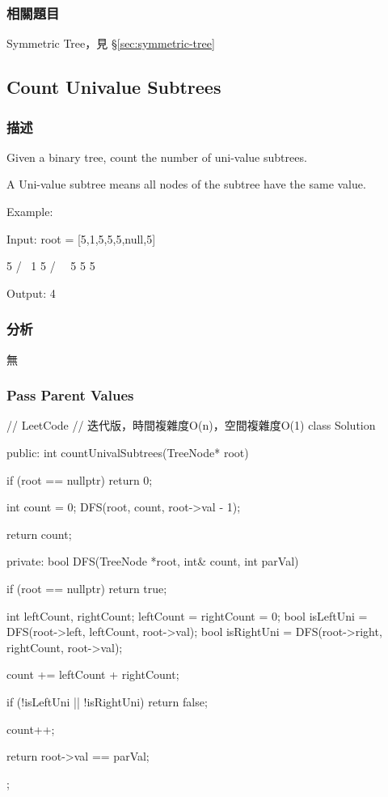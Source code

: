 \subsubsection{相關題目}
\begindot
\item Symmetric Tree，見 \S \ref{sec:symmetric-tree}
\myenddot

\subsection{Count Univalue Subtrees}
\label{sec:count-univalue-subtrees}


\subsubsection{描述}
Given a binary tree, count the number of uni-value subtrees.

A Uni-value subtree means all nodes of the subtree have the same value.

Example:

\begin{Code}
Input:  root = [5,1,5,5,5,null,5]

              5
             / \
            1   5
           / \   \
          5   5   5

Output: 4
\end{Code}

\subsubsection{分析}
無

\subsubsection{Pass Parent Values}
\begin{Code}
// LeetCode
// 迭代版，時間複雜度O(n)，空間複雜度O(1)
class Solution {
public:
    int countUnivalSubtrees(TreeNode* root) {
        if (root == nullptr) return 0;

        int count = 0;
        DFS(root, count, root->val - 1);

        return count;
    }
private:
    bool DFS(TreeNode *root, int& count, int parVal) {
        if (root == nullptr) return true;

        int leftCount, rightCount; leftCount = rightCount = 0;
        bool isLeftUni = DFS(root->left, leftCount, root->val);
        bool isRightUni = DFS(root->right, rightCount, root->val);

        count += leftCount + rightCount;

        if (!isLeftUni || !isRightUni) return false;

        count++;

        return root->val == parVal;
    }
};
\end{Code}

